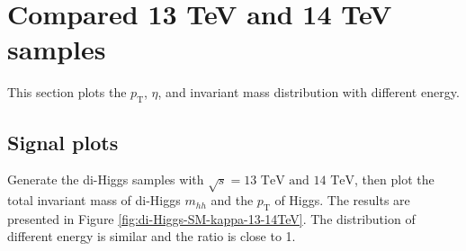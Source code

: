\documentclass[12pt]{article}
\begin{document}
\section{Compared 13 TeV and 14 TeV samples}%
\label{sec:compared_13_tev_and_14_tev_samples}
	This section plots the $p_\text{T}$, $\eta$, and invariant mass distribution with different energy.
	\subsection{Signal plots}%
	\label{sub:signal_plots}
		Generate the di-Higgs samples with $\sqrt{s} = \text{13 TeV and 14 TeV}$, then plot the total invariant mass of di-Higgs $m_{hh}$ and the $p_{\text{T}}$ of Higgs. The results are presented in Figure \ref{fig:di-Higgs-SM-kappa-13-14TeV}. The distribution of different energy is similar and the ratio is close to 1.
\end{document}
